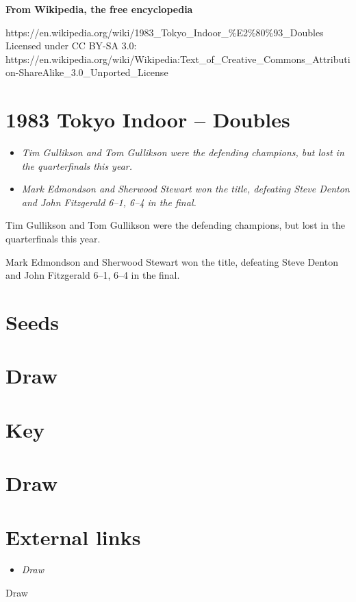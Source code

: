 \textbf{From Wikipedia, the free encyclopedia}

https://en.wikipedia.org/wiki/1983\_Tokyo\_Indoor\_\%E2\%80\%93\_Doubles\\
Licensed under CC BY-SA 3.0:\\
https://en.wikipedia.org/wiki/Wikipedia:Text\_of\_Creative\_Commons\_Attribution-ShareAlike\_3.0\_Unported\_License

\section{1983 Tokyo Indoor -- Doubles}\label{tokyo-indoor-doubles}

\begin{itemize}
\item
  \emph{Tim Gullikson and Tom Gullikson were the defending champions,
  but lost in the quarterfinals this year.}
\item
  \emph{Mark Edmondson and Sherwood Stewart won the title, defeating
  Steve Denton and John Fitzgerald 6--1, 6--4 in the final.}
\end{itemize}

Tim Gullikson and Tom Gullikson were the defending champions, but lost
in the quarterfinals this year.

Mark Edmondson and Sherwood Stewart won the title, defeating Steve
Denton and John Fitzgerald 6--1, 6--4 in the final.

\section{Seeds}\label{seeds}

\section{Draw}\label{draw}

\section{Key}\label{key}

\section{Draw}\label{draw-1}

\section{External links}\label{external-links}

\begin{itemize}
\item
  \emph{Draw}
\end{itemize}

Draw

